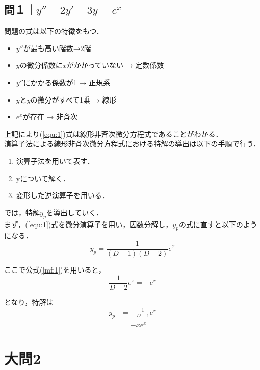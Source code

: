 \documentclass[a4paper,11pt]{bxjsarticle}
\begin{document}
\subsection{問１｜$y''-2y'-3y=e^x$}
問題の式は以下の特徴をもつ．

\begin{itemize}
  \item $y''$が最も高い階数→2階
  \item $y$の微分係数に$x$がかかっていない → 定数係数
  \item $y''$にかかる係数が1 → 正規系
  \item $y$と$y$の微分がすべて1乗 → 線形
  \item $e^x$が存在 → 非斉次
\end{itemize}

上記により(\ref{equ:1})式は線形非斉次微分方程式であることがわかる．\\

演算子法による線形非斉次微分方程式における特解の導出は以下の手順で行う．

\begin{enumerate}
  \item 演算子法を用いて表す．
  \item yについて解く．
  \item 変形した逆演算子を用いる．
\end{enumerate}

では，特解$y_p$を導出していく．\\
まず，(\ref{equ:1})式を微分演算子を用い，因数分解し，$y_p$の式に直すと以下のようになる．
\begin{equation}
  y_p = \frac{1}{(D-1)(D-2)}e^x
\end{equation}

ここで公式(\ref{mf:1})を用いると，
\begin{equation}
  \frac{1}{D-2}e^x=-e^x
\end{equation}

となり，特解は
\begin{align}
  y_p &= -\frac{1}{D-1}e^x\\
  &= -xe^x
\end{align}



\section{大問2}
\subsection{}




 
\end{document}

